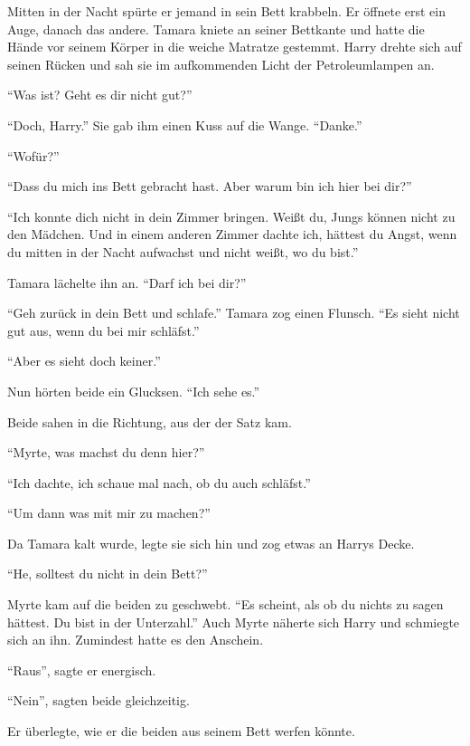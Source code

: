 Mitten in der Nacht spürte er jemand in sein Bett krabbeln. Er öffnete erst ein Auge, danach das andere. Tamara kniete an seiner Bettkante und hatte die Hände vor seinem Körper in die weiche Matratze gestemmt. Harry drehte sich auf seinen Rücken und sah sie im aufkommenden Licht der Petroleumlampen an.

\enquote{Was ist? Geht es dir nicht gut?}

\enquote{Doch, Harry.} Sie gab ihm einen Kuss auf die Wange. \enquote{Danke.}

\enquote{Wofür?}

\enquote{Dass du mich ins Bett gebracht hast. \gst Aber warum bin ich hier bei dir?}

\enquote{Ich konnte dich nicht in dein Zimmer bringen. Weißt du, Jungs können nicht zu den Mädchen. Und in einem anderen Zimmer dachte ich, hättest du Angst, wenn du mitten in der Nacht aufwachst und nicht weißt, wo du bist.}

Tamara lächelte ihn an. \enquote{Darf ich bei dir\abs?}

\enquote{Geh zurück in dein Bett und schlafe.} Tamara zog einen Flunsch. \enquote{Es sieht nicht gut aus, wenn du bei mir schläfst.}

\enquote{Aber es sieht doch keiner.}

Nun hörten beide ein Glucksen. \enquote{Ich sehe es.}

Beide sahen in die Richtung, aus der der Satz kam.

\enquote{Myrte, was machst du denn hier?}

\enquote{Ich dachte, ich schaue mal nach, ob du auch schläfst.}

\enquote{Um dann was mit mir zu machen?}

Da Tamara kalt wurde, legte sie sich hin und zog etwas an Harrys Decke.

\enquote{He, solltest du nicht in dein Bett?}

Myrte kam auf die beiden zu geschwebt. \enquote{Es scheint, als ob du nichts zu sagen hättest. Du bist in der Unterzahl.} Auch Myrte näherte sich Harry und schmiegte sich an ihn. Zumindest hatte es den Anschein.

\enquote{Raus}, sagte er energisch.

\enquote{Nein}, sagten beide gleichzeitig.

Er überlegte, wie er die beiden aus seinem Bett werfen könnte. 

